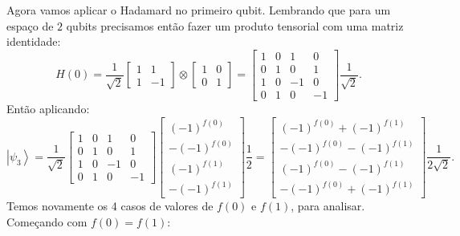 Agora vamos aplicar o Hadamard no primeiro qubit. Lembrando que para um espaço de $2$ qubits precisamos então fazer um produto tensorial com uma matriz identidade:
\begin{equation}
H\left(0\right)=\frac{1}{\sqrt{2}}\left[\begin{array}{cc}
1 & 1\\
1 & -1
\end{array}\right]\otimes\left[\begin{array}{cc}
1 & 0\\
0 & 1
\end{array}\right]=\left[\begin{array}{cccc}
1 & 0 & 1 & 0\\
0 & 1 & 0 & 1\\
1 & 0 & -1 & 0\\
0 & 1 & 0 & -1
\end{array}\right]\frac{1}{\sqrt{2}}
. \end{equation}
Então aplicando:
\begin{equation}
\left|\psi_{3}\right\rangle =\frac{1}{\sqrt{2}}\left[\begin{array}{cccc}
1 & 0 & 1 & 0\\
0 & 1 & 0 & 1\\
1 & 0 & -1 & 0\\
0 & 1 & 0 & -1
\end{array}\right]\left[\begin{array}{c}
\left(-1\right)^{f\left(0\right)}\\
-\left(-1\right)^{f\left(0\right)}\\
\left(-1\right)^{f\left(1\right)}\\
-\left(-1\right)^{f\left(1\right)}
\end{array}\right]\frac{1}{2} 
=
\left[\begin{array}{c}
\left(-1\right)^{f\left(0\right)}+\left(-1\right)^{f\left(1\right)}\\
-\left(-1\right)^{f\left(0\right)}-\left(-1\right)^{f\left(1\right)}\\
\left(-1\right)^{f\left(0\right)}-\left(-1\right)^{f\left(1\right)}\\
-\left(-1\right)^{f\left(0\right)}+\left(-1\right)^{f\left(1\right)}
\end{array}\right]\frac{1}{2\sqrt{2}}
. \end{equation}
Temos novamente os 4 casos de valores de $f\left(0\right)$ e $f\left(1\right)$, para analisar.  Começando com $f\left(0\right)=f\left(1\right)$:
